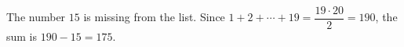 The number $15$ is missing from the list. Since $1+2+\cdots+19=\dfrac{19\cdot20}{2}=190$, the sum is $190-15=\boxed{175}$.
